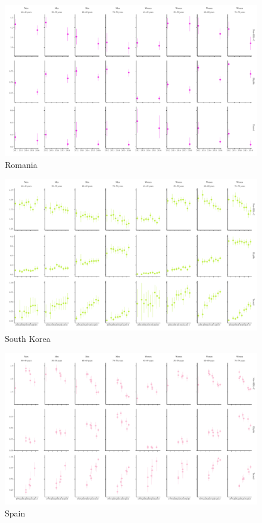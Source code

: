 \documentclass[12pt]{article}
\begin{document}
\begin{appendix}
\begin{landscape}
        \begin{figure}[H]
            \centering
            \includegraphics[width=\linewidth]{../3_figures/countries/fig_romania.pdf}
            \caption{Romania}
            \label{fig:romania}
        \end{figure}

        \begin{figure}[H]
            \centering
            \includegraphics[width=\linewidth]{../3_figures/countries/fig_south korea.pdf}
            \caption{South Korea}
            \label{fig:korea}
        \end{figure}

        \begin{figure}[H]
            \centering
            \includegraphics[width=\linewidth]{../3_figures/countries/fig_spain.pdf}
            \caption{Spain}
            \label{fig:spain}
        \end{figure}


\end{landscape}
\end{appendix}
\end{document}
